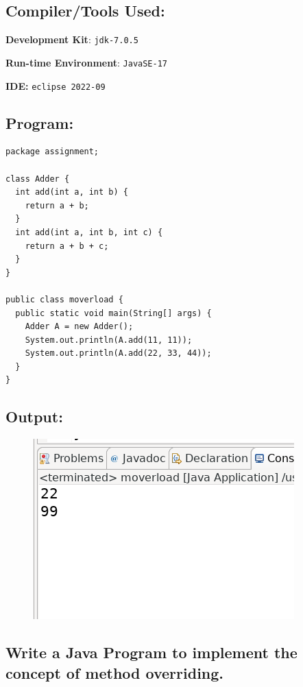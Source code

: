 \documentclass[12pt, a4paper]{article}
\begin{document}
\subsection*{Compiler/Tools Used:}
\textbf{Development Kit}: \verb+jdk-7.0.5+

\textbf{Run-time Environment}: \verb+JavaSE-17+

\textbf{IDE:} \verb+eclipse 2022-09+

\subsection*{Program:}
\begin{lstlisting}
package assignment;

class Adder {
  int add(int a, int b) {
    return a + b;
  }
  int add(int a, int b, int c) {
    return a + b + c;
  }
}

public class moverload {
  public static void main(String[] args) {
    Adder A = new Adder();
    System.out.println(A.add(11, 11));
    System.out.println(A.add(22, 33, 44));
  }
}
\end{lstlisting}
\newpage

\subsection*{Output:}
\begin{figure}[h]
  \centering
  \includegraphics[width=\textwidth]{moverload}
\end{figure}
\newpage

\begin{tcolorbox}
\section{Write a Java Program to implement the concept of method overriding.}
\end{tcolorbox}
\end{document}
